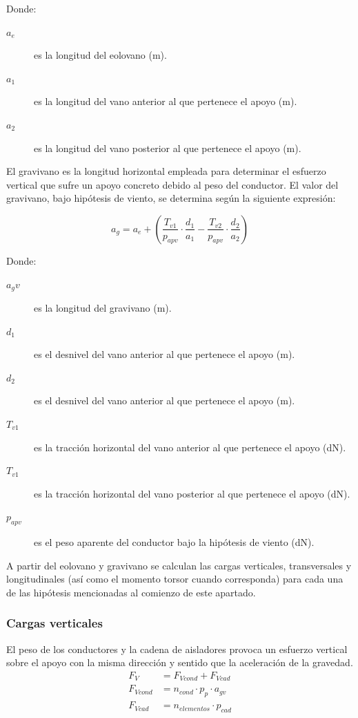 Donde:
\begin{description}
    \item[$a_e$] es la longitud del eolovano (\si{\meter}).
    \item[$a_1$] es la longitud del vano anterior al que pertenece el apoyo (\si{\meter}).
    \item[$a_2$] es la longitud del vano posterior al que pertenece el apoyo (\si{\meter}).
\end{description}

El gravivano es la longitud horizontal empleada para determinar el esfuerzo vertical que sufre un apoyo concreto debido al peso del conductor. El valor del gravivano, bajo hipótesis de viento, se determina según la siguiente expresión:

\begin{equation}
    a_g=a_e+(\frac{T_{v1}}{p_{apv}}\cdot\frac{d_1}{a_1}-\frac{T_{v2}}{p_{apv}}\cdot\frac{d_2}{a_2})
    \label{eq:gravivano}
\end{equation}

Donde:
\begin{description}
    \item[$a_gv$] es la longitud del gravivano (\si{\meter}).
    \item[$d_1$] es el desnivel del vano anterior al que pertenece el apoyo (\si{\meter}).
    \item[$d_2$] es el desnivel del vano anterior al que pertenece el apoyo (\si{\meter}).
    \item[$T_{v1}$] es la tracción horizontal del vano anterior al que pertenece el apoyo (\si{\deca\newton}).
    \item[$T_{v1}$] es la tracción horizontal del vano posterior al que pertenece el apoyo (\si{\deca\newton}).
    \item[$p_{apv}$] es el peso aparente del conductor bajo la hipótesis de viento (\si{\deca\newton}).
\end{description}

 A partir del eolovano y gravivano se calculan las cargas verticales, transversales y longitudinales (así como el momento torsor cuando corresponda) para cada una de las hipótesis mencionadas al comienzo de este apartado.
 
\subsubsection{Cargas verticales}
\label{subsubsec:apoyos-cargasV}
El peso de los conductores y la cadena de aisladores provoca un esfuerzo vertical sobre el apoyo con la misma dirección y sentido que la aceleración de la gravedad.
\begin{align}
    F_V &=F_{Vcond}+F_{Vcad}
    \label{eq:esfuerzo-vertical}\\[0.5em]
    F_{Vcond} &= n_{cond}\cdot p_p\cdot a_{gv}
    \label{eq:esfuerzo-vertical-conductor}\\[0.5em]
    F_{Vcad} &= n_{elementos}\cdot p_{cad}
    \label{eq:esfuerzo-vertical-cadena}
\end{align}

